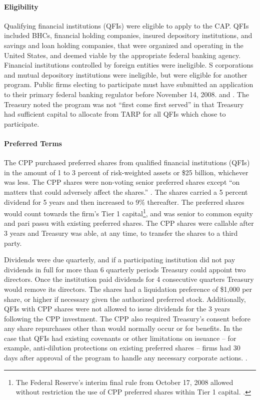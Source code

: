 \documentclass[12pt]{article}
\begin{document}
\paragraph{Eligibility}

Qualifying financial institutions (QFIs) were eligible to apply to the CAP. QFIs included BHCs, financial holding companies, insured depository institutions, and savings and loan holding companies, that were organized and operating in the United States, and deemed viable by the appropriate federal banking agency. Financial institutions controlled by foreign entities were ineligible. S corporations and mutual depository institutions were ineligible, but were eligible for another program. Public firms electing to participate must have submitted an application to their primary federal banking regulator before November 14, 2008. \citep{mofo} and \citep{CPPTerms}. The Treasury noted the program was not ``first come first served'' in that Treasury had sufficient capital to allocate from TARP for all QFIs which chose to participate. 

\paragraph{Preferred Terms}

The CPP purchased preferred shares from qualified financial institutions (QFIs) in the amount of 1 to 3 percent of risk-weighted assets or \$25 billion, whichever was less. The CPP shares were non-voting senior preferred shares except ``on matters that could adversely affect the shares.'' \citep{CPPAnnouncement}. The shares carried a 5 percent dividend for 5 years and then increased to 9\% thereafter. The preferred shares would count towards the firm's Tier 1 capital\footnote{The Federal Reserve's interim final rule from October 17, 2008 allowed without restriction the use of CPP preferred shares within Tier 1 capital. \citep{FedTier1}.}, and was senior to common equity and pari passu with existing preferred shares. The CPP shares were callable after 3 years and Treasury was able, at any time, to transfer the shares to a third party. 

Dividends were due quarterly, and if a participating institution did not pay dividends in full for more than 6 quarterly periods Treasury could appoint two directors. Once the institution paid dividends for 4 consecutive quarters Treasury would remove its directors. The shares had a liquidation preference of \$1,000 per share, or higher if necessary given the authorized preferred stock. Additionally, QFIs with CPP shares were not allowed to issue dividends for the 3 years following the CPP investment.  The CPP also required Treasury's consent before any share repurchases other than would normally occur or for benefits. In the case that QFIs had existing covenants or other limitations on issuance -- for example, anti-dilution protections on existing preferred shares --  firms had 30 days after approval of the program to handle any necessary corporate actions. \citep{mofo2}.
\end{document}
